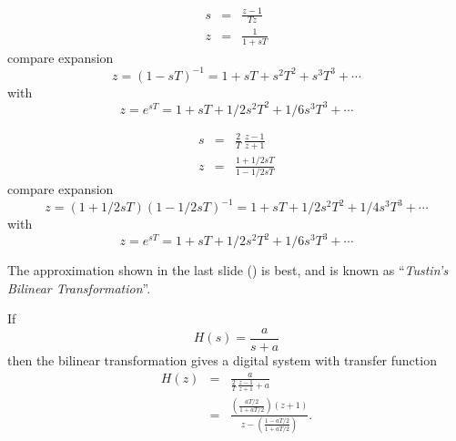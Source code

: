 \begin{slide}\label{slide:l11s21}
  
  \begin{eqnarray*}
     s &=& \frac{z-1}{Tz} \\
     z &=& \frac{1}{1 + sT}
  \end{eqnarray*}
  compare expansion $$z=(1-sT)^{-1} = 1 + sT + s^2T^2 + s^3T^3
 + \cdots$$  with $$z = e^{sT} = 1 + sT + 1/2 s^2T^2 + 1/6 s^3T^3 + \cdots$$
\end{slide}

\begin{slide}\label{slide:l11s22}
  
  \begin{eqnarray*}
     s &=& \frac{2}{T}\, \frac{z-1}{z+1} \\
     z &=& \frac{1 + 1/2 sT}{1 - 1/2 sT}
  \end{eqnarray*}
  compare expansion $$z=(1+ 1/2 sT)(1- 1/2 sT)^{-1} = 1 + sT + 1/2
 s^2T^2 + 1/4 s^3T^3
 + \cdots$$  with $$z = e^{sT} = 1 + sT + 1/2 s^2T^2 + 1/6 s^3T^3 + \cdots$$
\end{slide}

The approximation shown in the last slide () is
best, and is known as ``\emph{Tustin's Bilinear Transformation}''.

\begin{slide}\label{slide:l11s23}
  If \[H(s) = \frac{a}{s+a}\] then the bilinear transformation gives a
  digital system with transfer function
  \begin{eqnarray*}
    H(z)&=& \frac{a}{\frac{2}{T}\,\frac{z-1}{z+1}+a} \\
        &=& \frac{\left(\frac{aT/2}{1+aT/2}\right)(z+1)}{z-\left(\frac{1-aT/2}{1+aT/2}\right)}.
  \end{eqnarray*}
\end{slide}

\endinput

